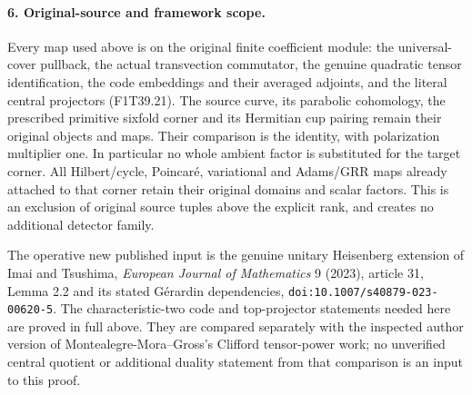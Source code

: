 \paragraph{6. Original-source and framework scope.}
Every map used above is on the original finite coefficient
module: the universal-cover pullback, the actual
transvection commutator, the genuine quadratic tensor
identification, the code embeddings and their averaged
adjoints, and the literal central projectors (F1T39.21).
The source curve, its parabolic cohomology, the prescribed
primitive sixfold corner and its Hermitian cup pairing
remain their original objects and maps. Their comparison
is the identity, with polarization multiplier one.
In particular no whole ambient factor is substituted for
the target corner. All Hilbert/cycle, Poincar\'e,
variational and Adams/GRR maps already attached to that
corner retain their original domains and scalar factors.
This is an exclusion of original source tuples above the
explicit rank, and creates no additional detector family.

The operative new published input is the genuine
unitary Heisenberg extension of Imai and Tsushima,
\emph{European Journal of Mathematics} 9 (2023), article 31,
Lemma 2.2 and its stated G\'erardin dependencies,
\nolinkurl{doi:10.1007/s40879-023-00620-5}.
The characteristic-two code and top-projector statements
needed here are proved in full above. They are compared
separately with the inspected author version of
Montealegre-Mora--Gross's Clifford tensor-power work;
no unverified central quotient or additional duality
statement from that comparison is an input to this proof.
